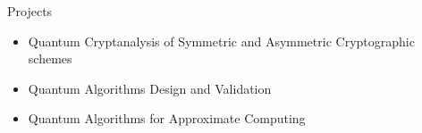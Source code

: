\documentclass[
	a4paper, %
	10pt, %
]{tresume} %
\begin{document}
\begin{tSection}{Projects}
  \begin{itemize}
  \item Quantum Cryptanalysis of Symmetric and Asymmetric Cryptographic schemes
  \item Quantum Algorithms Design and Validation
  \item Quantum Algorithms for Approximate Computing
  \end{itemize}

\end{tSection}
\end{document}
